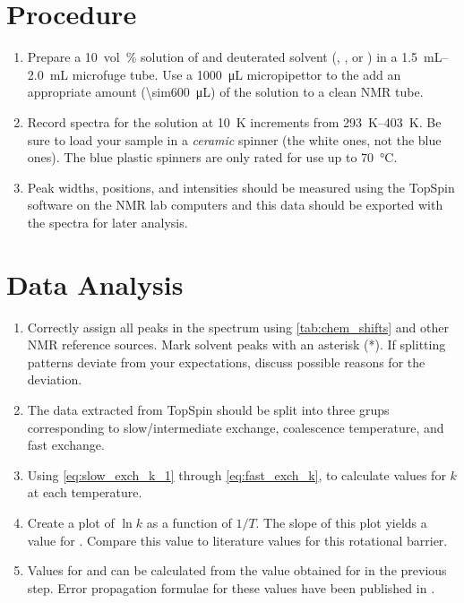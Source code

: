 \section{Procedure} %
\label{sec:procedure}

\begin{enumerate}
	\item Prepare a \qty{10}{vol\percent} solution of  and deuterated solvent (, , or ) in  a \SIrange{1.5}{2.0}{\mL} microfuge tube.
	Use a \qty{1000}{\uL} micropipettor to the add an appropriate amount (\qty{\sim600}{\uL}) of the solution to a clean NMR tube. 
	\item Record \NMR* spectra for the solution at \qty{10}{\kelvin} increments from \SIrange{293}{403}{\kelvin}.
	Be sure to load your sample in a \emph{ceramic} spinner (the white ones, not the blue ones). 
	The blue plastic spinners are only rated for use up to \qty{70}{\celsius}. 
	\item Peak widths, positions, and intensities should be measured using the TopSpin software on the NMR lab computers and this data should be exported with the spectra for later analysis. 
\end{enumerate}


\section{Data Analysis} %
\label{sec:data_analysis}

\begin{enumerate}
	\item Correctly assign all peaks in the spectrum using \cref{tab:chem_shifts} and other NMR reference sources.\autocite{davis1965advanced,pople1959nmr,silverstein2005spec,burdett1964a,rogers1956a}
	Mark solvent peaks with an asterisk (*). If splitting patterns deviate from your expectations, discuss possible reasons for the deviation. 
	\item The data extracted from TopSpin should be split into three grups corresponding to slow/intermediate exchange, coalescence temperature, and fast exchange. 
	\item Using \cref{eq:slow_exch_k_1} through \cref{eq:fast_exch_k}, to calculate values for \( k \) at each temperature. 
	\item Create a plot of \( \ln{k} \)  as a function of \( 1/T \). 
  The slope of this plot yields a value for . 
  Compare this value to literature values for this rotational barrier. 
	\item Values for  and  can be calculated from the value obtained for  in the previous step. 
  Error propagation formulae for these values have been published in \textcite{morse94nmr}.
\end{enumerate}

